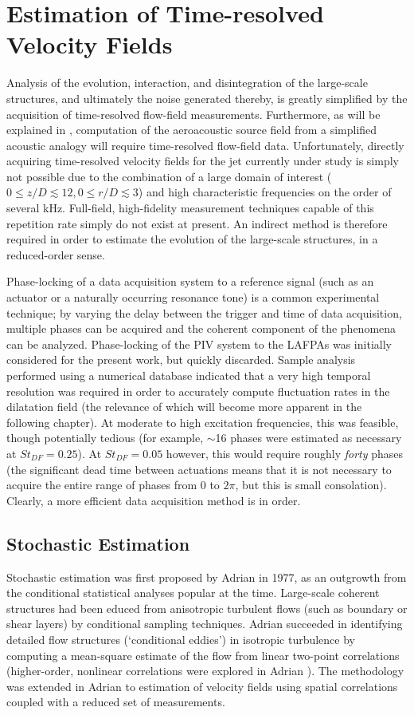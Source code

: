 \chapter{Estimation of Time-resolved Velocity Fields}
\label{sect:velocity}
Analysis of the evolution, interaction, and disintegration of the large-scale structures, and ultimately the noise generated thereby, is greatly simplified by the acquisition of time-resolved flow-field measurements.
Furthermore, as will be explained in , computation of the aeroacoustic source field from a simplified acoustic analogy will require time-resolved flow-field data.
Unfortunately, directly acquiring time-resolved velocity fields for the jet currently under study is simply not possible due to the combination of a large domain of interest ($0 \leq z/D \lesssim 12, 0 \leq r/D \lesssim 3$) and high characteristic frequencies on the order of several kHz.
Full-field, high-fidelity measurement techniques capable of this repetition rate simply do not exist at present.
An indirect method is therefore required in order to estimate the evolution of the large-scale structures, in a reduced-order sense.

Phase-locking of a data acquisition system to a reference signal (such as an actuator or a naturally occurring resonance tone) is a common experimental technique; by varying the delay between the trigger and time of data acquisition, multiple phases can be acquired and the coherent component of the phenomena can be analyzed.
Phase-locking of the PIV system to the LAFPAs was initially considered for the present work, but quickly discarded.
Sample analysis performed using a numerical database indicated that a very high temporal resolution was required in order to accurately compute fluctuation rates in the dilatation field (the relevance of which will become more apparent in the following chapter).
At moderate to high excitation frequencies, this was feasible, though potentially tedious (for example, $\sim$16 phases were estimated as necessary at $St_{DF} =0.25$).
At $St_{DF} =0.05$ however, this would require roughly \textit{forty} phases (the significant dead time between actuations means that it is not necessary to acquire the entire range of phases from $0$ to $2\pi$, but this is small consolation).
Clearly, a more efficient data acquisition method is in order.
\section{Stochastic Estimation}
Stochastic estimation was first proposed by Adrian \citep{Adrian1977} in 1977, as an outgrowth from the conditional statistical analyses popular at the time. 
Large-scale coherent structures had been educed from anisotropic turbulent flows (such as boundary or shear layers) by conditional sampling techniques.
Adrian succeeded in identifying detailed flow structures (`conditional eddies') in isotropic turbulence by computing a mean-square estimate of the flow from linear two-point correlations (higher-order, nonlinear correlations were explored in Adrian \citep{Adrian1979}). 
The methodology was extended in Adrian \citep{Adrian1994} to estimation of velocity fields using spatial correlations coupled with a reduced set of measurements.

